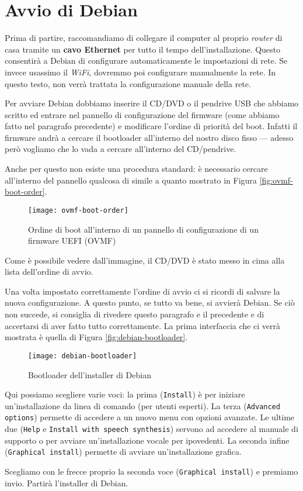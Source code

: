 \section{Avvio di Debian}\label{sec:starting-debian}
Prima di partire, raccomandiamo di collegare il computer al proprio \textit{router} di casa tramite un \textbf{cavo Ethernet} per tutto il tempo dell'installazione. Questo consentirà a Debian di configurare automaticamente le impostazioni di rete. Se invece usassimo il \textit{WiFi}, dovremmo poi configurare manualmente la rete. In questo testo, non verrà trattata la configurazione manuale della rete.

Per avviare Debian dobbiamo inserire il CD/DVD o il pendrive USB che abbiamo scritto ed entrare nel pannello di configurazione del firmware (come abbiamo fatto nel paragrafo precedente) e modificare l'ordine di priorità del boot. Infatti il firmware andrà a cercare il bootloader all'interno del nostro disco fisso --- adesso però vogliamo che lo vada a cercare all'interno del CD/pendrive.

Anche per questo non esiste una procedura standard: è necessario cercare all'interno del pannello qualcosa di simile a quanto mostrato in Figura \vref{fig:ovmf-boot-order}.

\begin{figure}[ht]
	\centering
	\texttt{[image: ovmf-boot-order]}
	\caption{Ordine di boot all'interno di un pannello di configurazione di un firmware UEFI (OVMF)}
	\label{fig:ovmf-boot-order}
\end{figure}

Come è possibile vedere dall'immagine, il CD/DVD è stato messo in cima alla lista dell'ordine di avvio.

Una volta impostato correttamente l'ordine di avvio ci si ricordi di salvare la nuova configurazione. A questo punto, se tutto va bene, si avvierà Debian. Se ciò non succede, si consiglia di rivedere questo paragrafo e il precedente e di accertarsi di aver fatto tutto correttamente. La prima interfaccia che ci verrà mostrata è quella di Figura \vref{fig:debian-bootloader}.

\begin{figure}[ht]
	\centering
	\texttt{[image: debian-bootloader]}
	\caption{Bootloader dell'installer di Debian}
	\label{fig:debian-bootloader}
\end{figure}

Qui possiamo scegliere varie voci: la prima (\texttt{Install}) è per iniziare un'installazione da linea di comando (per utenti esperti). La terza (\texttt{Advanced options}) permette di accedere a un nuovo menu con opzioni avanzate. Le ultime due (\texttt{Help} e \texttt{Install with speech synthesis}) servono ad accedere al manuale di supporto o per avviare un'installazione vocale per ipovedenti. La seconda infine (\texttt{Graphical install}) permette di avviare un'installazione grafica.

Scegliamo con le frecce proprio la seconda voce (\texttt{Graphical install}) e premiamo invio. Partirà l'installer di Debian.

